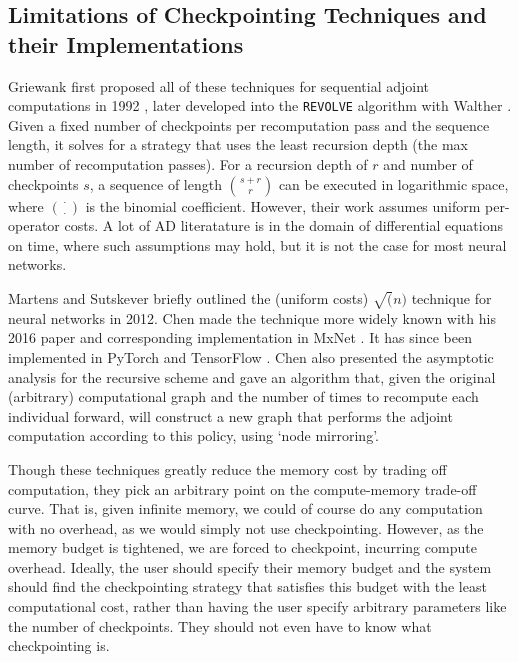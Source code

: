 \subsection{Limitations of Checkpointing Techniques and their Implementations}
Griewank first proposed all of these techniques for sequential adjoint computations in 1992 \cite{Griewank1992}, later developed into the \texttt{REVOLVE} algorithm with Walther \cite{Revolve2000}.
Given a fixed number of checkpoints per recomputation pass and the sequence length, it solves for a strategy that uses the least recursion depth (the max number of recomputation passes).
For a recursion depth of \(r\) and number of checkpoints \(s\), a sequence of length \(\binom{s+r}{r}\) can be executed in logarithmic space, where \(\binom{\cdot}{\cdot}\) is the binomial coefficient.
However, their work assumes uniform per-operator costs.
A lot of AD literatature is in the domain of differential equations on time, where such assumptions may hold, but it is not the case for most neural networks.

Martens and Sutskever \cite{Martens2012} briefly outlined the (uniform costs) \(\sqrt(n)\) technique for neural networks in 2012.
Chen made the technique more widely known with his 2016 paper \cite{Chen2016} and corresponding implementation in MxNet \cite{mxnet-memonger}.
It has since been implemented in PyTorch \cite{torch-memonger} and TensorFlow \cite{openai-checkpointing}.
Chen also presented the asymptotic analysis for the recursive scheme and gave an algorithm that, given the original (arbitrary) computational graph and the number of times to recompute each individual forward, will construct a new graph that performs the adjoint computation according to this policy, using `node mirroring'.

Though these techniques greatly reduce the memory cost by trading off computation, they pick an arbitrary point on the compute-memory trade-off curve.
That is, given infinite memory, we could of course do any computation with no overhead, as we would simply not use checkpointing.
However, as the memory budget is tightened, we are forced to checkpoint, incurring compute overhead.
Ideally, the user should specify their memory budget and the system should find the checkpointing strategy that satisfies this budget with the least computational cost, rather than having the user specify arbitrary parameters like the number of checkpoints.
They should not even have to know what checkpointing is.

